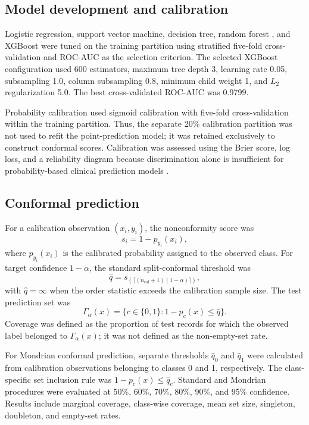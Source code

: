 \documentclass{ieeeaccess}
\begin{document}
\subsection{Model development and calibration}
Logistic regression, support vector machine, decision tree, random forest \cite{breiman2001randomforest}, and XGBoost were tuned on the training partition using stratified five-fold cross-validation and ROC-AUC as the selection criterion. The selected XGBoost configuration used 600 estimators, maximum tree depth 3, learning rate 0.05, subsampling 1.0, column subsampling 0.8, minimum child weight 1, and $L_2$ regularization 5.0. The best cross-validated ROC-AUC was 0.9799.

Probability calibration used sigmoid calibration with five-fold cross-validation within the training partition. Thus, the separate 20\% calibration partition was not used to refit the point-prediction model; it was retained exclusively to construct conformal scores. Calibration was assessed using the Brier score, log loss, and a reliability diagram because discrimination alone is insufficient for probability-based clinical prediction models \cite{vancalster2019calibration}.

\subsection{Conformal prediction}
For a calibration observation $(x_i,y_i)$, the nonconformity score was
\begin{equation}
s_i=1-p_{y_i}(x_i),
\end{equation}
where $p_{y_i}(x_i)$ is the calibrated probability assigned to the observed class. For target confidence $1-\alpha$, the standard split-conformal threshold was
\begin{equation}
\hat q= s_{(\lceil(n_{\mathrm{cal}}+1)(1-\alpha)\rceil)},
\end{equation}
with $\hat q=\infty$ when the order statistic exceeds the calibration sample size. The test prediction set was
\begin{equation}
\Gamma_{\alpha}(x)=\{c\in\{0,1\}:1-p_c(x)\leq\hat q\}.
\end{equation}
Coverage was defined as the proportion of test records for which the observed label belonged to $\Gamma_{\alpha}(x)$; it was not defined as the non-empty-set rate.

For Mondrian conformal prediction, separate thresholds $\hat q_0$ and $\hat q_1$ were calculated from calibration observations belonging to classes 0 and 1, respectively. The class-specific set inclusion rule was $1-p_c(x)\leq\hat q_c$. Standard and Mondrian procedures were evaluated at 50\%, 60\%, 70\%, 80\%, 90\%, and 95\% confidence. Results include marginal coverage, class-wise coverage, mean set size, singleton, doubleton, and empty-set rates.
\end{document}
